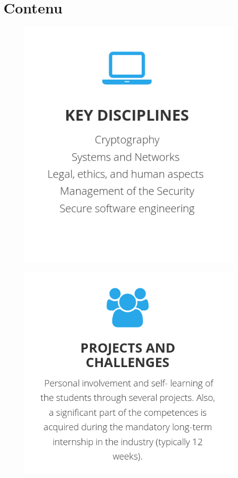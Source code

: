 \documentclass{beamer}
\begin{document}
\section{Contenu}

\begin{frame}[c]
  \begin{figure}
    \includegraphics[height=\textheight]{imgs/key_disciplines.png}
  \end{figure}
\end{frame}

\begin{frame}[c]
  \begin{figure}
    \includegraphics[height=\textheight]{imgs/projects_challenges.png}
  \end{figure}
\end{frame}
\end{document}
